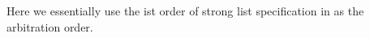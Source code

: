 
Here we essentially use the ist order of strong list specification in \cite{Attiya:2016} as the arbitration order. 















